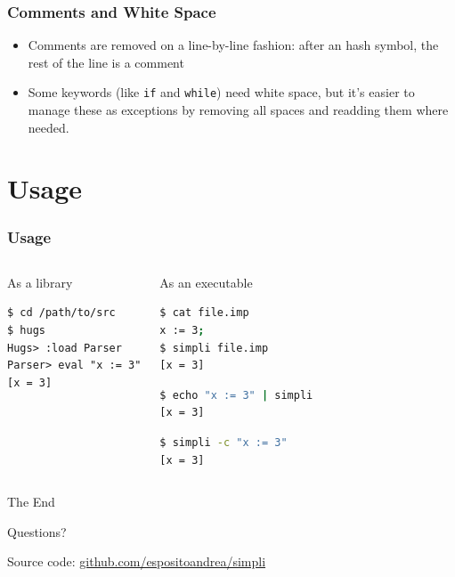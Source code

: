 \documentclass{beamer}
\begin{document}
\begin{frame}[fragile]
	\frametitle{Comments and White Space}
	\begin{itemize}
		\footnotesize
		\item Comments are removed on a line-by-line fashion: after an hash
			symbol, the rest of the line is a comment
	\end{itemize}
	
	\begin{itemize}
		\footnotesize
		\item Some keywords (like \texttt{if} and \texttt{while}) need
			white space, but it's easier to manage these as exceptions by
			removing all spaces and readding them where needed.
	\end{itemize}
	
\end{frame}

\section{Usage}
\begin{frame}[fragile]
	\frametitle{Usage}
	\begin{columns}
		\begin{block}{As a library}
\begin{lstlisting}
$ cd /path/to/src
$ hugs
Hugs> :load Parser
Parser> eval "x := 3"
[x = 3]
\end{lstlisting}
			\end{block}
		\begin{block}{As an executable}
\begin{lstlisting}[language=sh]
$ cat file.imp
x := 3;
$ simpli file.imp
[x = 3]
\end{lstlisting}
\begin{lstlisting}[language=sh]
$ echo "x := 3" | simpli
[x = 3]
\end{lstlisting}
\begin{lstlisting}[language=sh]
$ simpli -c "x := 3"
[x = 3]
\end{lstlisting}
		\end{block}
	\end{columns}
\end{frame}

{
	\settocustomtemplate
	\begin{frame}
		\color{white}
		\vfill
		\begin{center}
			\Large
			The End
		\end{center}
		\begin{center}
			\small
			Questions?
		\end{center}
		\vfill
		\begin{center}
			\scriptsize
			Source code:
			\href{https://github.com/espositoandrea/simpli}{%
				\color{mylinkcolor}github.com/espositoandrea/simpli
			}
		\end{center}
	\end{frame}
}
\end{document}
